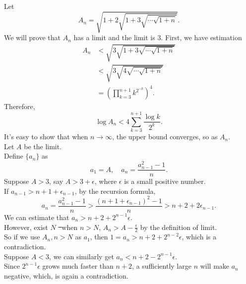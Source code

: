 \documentclass[UTF8,12pt]{article}
\begin{document}
\noindent
Let \[
	A_n = \sqrt{1+2\sqrt{1+3\sqrt{\cdots\sqrt{1+n}}}}
.\] We will prove that $A_n$ has a limit and the limit is $3$.
First, we have estimation
\begin{equation}
	\begin{aligned}
		A_n&<\sqrt{3\sqrt{1+3\sqrt{\cdots\sqrt{1+n}}}}\\
		&<\sqrt{3\sqrt{4\sqrt{\cdots\sqrt{1+n}}}}\\
		&=(\prod_{k=3}^{n+1}k^{2^{-k}})^4.
	\end{aligned}
\end{equation}
Therefore, \[
	\log A_n < 4 \sum_{k=3}^{n+1}\frac{\log k}{2^k}
.\]
It's easy to show that when $n \to \infty$, the upper bound converges, so as $A_n$.\\
Let $A$ be the limit.\\
Define $\{a_n\}$ as \[
	a_1=A,\quad a_{n}=\frac{a_{n-1}^2-1}{n}
.\]
Suppose $A > 3$, say $A > 3+\epsilon$, where $\epsilon$ is a small positive number.\\
If $a_{n-1} > n+1+\epsilon_{n-1}$, by the recursion formula, \[
	a_n=\frac{a_{n-1}^2-1}{n}>\frac{(n+1+\epsilon_{n-1})^2-1}{n}>n+2+2\epsilon_{n-1}
.\]
We can estimate that $a_n > n+2+2^{n-1}\epsilon$.\\
However, exist $N$ \st\ when $n>N$, $A_n>A-\frac{\epsilon}{2}$ by the definition of limit.\\
So if we use $A_n,n>N$ as $a_1$, then $1 = a_n > n+2+2^{n-2}\epsilon$, which is a contradiction.\\
Suppose $A < 3$, we can similarly get $a_n < n+2-2^{n-1}\epsilon$.\\
Since $2^{n-1}\epsilon$ grows much faster than $n+2$, a sufficiently large $n$ will make $a_n$ negative, 
which, is again a contradiction.
\end{document}
